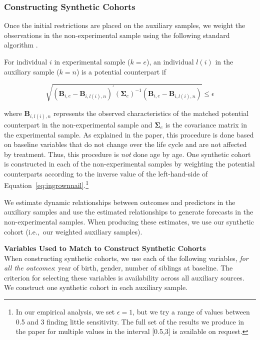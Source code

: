 \subsubsection{Constructing Synthetic Cohorts}\label{appendix:match}

\noindent Once the initial restrictions are placed on the auxiliary samples, we weight the observations in the non-experimental sample using the following standard algorithm \citep[e.g.,][]{Frolich_2005_Estimators_SC}.

\onehalfspacing
\begin{algorithm} \label{alg:match}
For individual $i$ in experimental sample ($k=e$), an individual $l(i)$ in the auxiliary sample ($k=n$) is a potential counterpart if

\begin{equation}\label{eq:ingrownnail}
\sqrt{(\bm{B}_{i,e} - \bm{B}_{i,l(i),n})^\prime (\bm{\Sigma}_e)^{-1} (\bm{B}_{i,e} - \bm{B}_{i,l(i),n})} \leq \epsilon
\end{equation}

\noindent where $\bm{B}_{i,l(i),n}$ represents the observed characteristics of the matched potential counterpart in the non-experimental sample and $\bm{\Sigma}_e$ is the covariance matrix in the experimental sample. As explained in the paper, this procedure is done based on baseline variables that do not change over the life cycle and are not affected by treatment. Thus, this procedure is \textit{not} done age by age. One synthetic cohort is constructed in each of the non-experimental samples by weighting the potential counterparts according to the inverse value of the left-hand-side of Equation~\eqref{eq:ingrownnail}.\footnote{In our empirical analysis, we set $\epsilon = 1$, but we try a range of values between 0.5 and 3 finding little sensitivity. The full set of the results we produce in the paper for multiple values in the interval [0.5,3] is available on request.}
\end{algorithm}
\doublespacing

\noindent We estimate dynamic relationships between outcomes and predictors in the auxiliary samples and use the estimated relationships to generate forecasts in the non-experimental samples. When producing these estimates, we use our synthetic cohort (i.e.,\ our weighted auxiliary samples).

\noindent \textbf{Variables Used to Match to Construct Synthetic Cohorts}\\
When constructing synthetic cohorts, we use each of the following variables, \textit{for all the outcomes}: year of birth, gender, number of siblings at baseline. The criterion for selecting these variables is availability across all auxiliary sources. We construct one synthetic cohort in each auxiliary sample.

